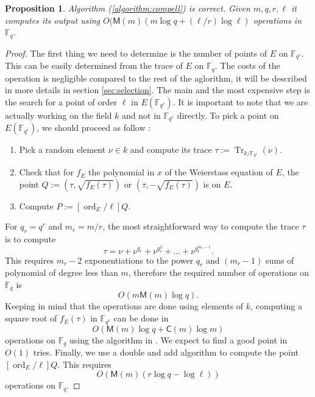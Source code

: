 \documentclass[12pt]{article}
\theoremstyle{plain}
\newtheorem{proposition}[theorem]{Proposition}
\theoremstyle{definition}
\DeclareMathOperator{\trace}{Tr} %
\DeclareMathOperator{\order}{ord} %
\def\F{\ensuremath{\mathbb{F}}}
\def\MM{\ensuremath{\mathsf{M}}}
\def\CC{\ensuremath{\mathsf{C}}}
\newcounter{algorithm}
\begin{document}
\begin{proposition}
Algorithm (\ref{algorithm:compell}) is correct. Given $m,q,r,\ell$ it computes
its output using $O(\MM(m)(m\log{q} + (\ell/r)\log{\ell})$ operations in $\F_q$.
\end{proposition}
\begin{proof}
The first thing we need to determine is the number of points of $E$ on
$\F_{q^r}$. This can be easily determined from the trace of $E$ on $\F_q$. The
costs of the operation is negligible compared to the rest of the aglorithm, it
will be described in more details in section \ref{sec:selection}.
The main and the most expensive step is the search for a point of order $\ell$
in $E(\F_{q^r})$. It is important to note that we are actually working on the
field $k$ and not in $\F_{q^r}$ directly. To pick a point on $E(\F_{q^r})$, we
should proceed as follow :
\begin{enumerate}
    \item Pick a random element $\nu\in k$ and compute its trace 
$\tau:=\trace_{k/\F_{q^r}}(\nu)$.
    \item Check that for $f_E$ the polynomial in $x$ of the Weierstass equation
of $E$, the point $Q:=(\tau, \sqrt{f_E(\tau)})$ or $(\tau, -\sqrt{f_E(\tau)})$ 
is on $E$.
    \item Compute $P:=[\order_E/\ell]Q$.
\end{enumerate}

For $q_r=q^r$ and $m_r = m/r$, the most straightforward way to compute the trace
$\tau$ is to compute 
\[
\tau=\nu+\nu^{q_r}+\nu^{q_r^2}+\dots+\nu^{q_r^{m_r-1}}.
\]
This requires $m_r-2$ exponentiations to the power $q_r$ and $(m_r-1)$ 
sums of polynomial of degree less than $m$, therefore the required number of
operations on $\F_q$ is 
\begin{equation}
O(m\MM(m)\log{q}).
\end{equation}
Keeping in mind that the operations are done using elements of $k$, computing a
square root of $f_E(\tau)$ in $\F_{q^r}$ can be done in 
\begin{equation}
O(\MM(m)\log{q} + \CC(m)\log{m})
\end{equation}
operations on $\F_q$ using the algorithm in \cite{doliskanischost2011}. We 
expect to find a good point in $O(1)$ tries. Finally, we use a double and add 
algorithm to compute the point $[\order_E/\ell]Q$. This requires 
\begin{equation}
O(\MM(m)(r\log{q}-\log{\ell}))
\end{equation}
operations on $\F_q$.


\end{proof}
\end{document}

